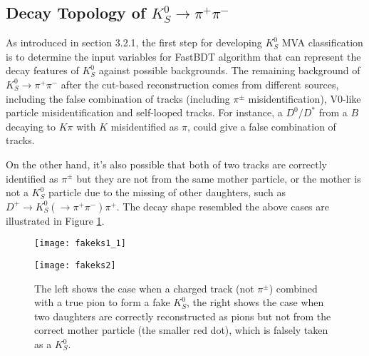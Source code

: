 \begin{comment}
\begin{figure}[htpb]
\centering
\texttt{[image: speedFBDT]}
\caption{Runtime in fitting phase with different hyper-parameters comparison among FastBDT and XGBT,TMVA,scikit-learn.\cite{keck2016fastbdt}}
\end{figure}
\end{comment}

\subsection{Decay Topology of $K_S^0 \to \pi^+ \pi^-$}
As introduced in section 3.2.1, the first step for developing $K_S^0$ MVA classification is to determine the input variables for FastBDT algorithm that can represent the decay features of $K_S^0$ against possible backgrounds.
The remaining background of  $K_S^0 \to \pi^+ \pi^-$ after the cut-based reconstruction comes from different sources, including the false combination of tracks (including $\pi^{\pm}$ misidentification), V0-like particle misidentification and self-looped tracks.
For instance, a $D^0/D^*$ from a $B$ decaying to $K\pi$ with $K$ misidentified as $\pi$, could give a false combination of tracks. 


On the other hand, it's also possible that both of two tracks are correctly identified as $\pi^{\pm}$ but they are not from the same mother particle, or the mother is not a $K_S^0$ particle due to the missing of other daughters, such as $D^+ \to K_S^0 (  \to \pi^+ \pi^-) \pi^+$. The decay shape resembled the above cases are illustrated in Figure \ref{fig:fakeks1}. 


\begin{figure}[htpb]
	\begin{minipage}[t]{0.5\linewidth} %
		\centering 
		\texttt{[image: fakeks1\_1]} 
	\end{minipage}%
	\begin{minipage}[t]{0.5\linewidth} 
		\centering 
		\texttt{[image: fakeks2]} 
	\end{minipage}%
	
	\caption{The left shows the case when a charged track (not $\pi^{\pm}$) combined with a true pion to form a fake $K_S^0$, the right shows the case when two daughters are correctly reconstructed as pions but not from the correct mother particle (the smaller red dot), which is falsely taken as a $K_S^0$.}
	\label{fig:fakeks1}
\end{figure}

